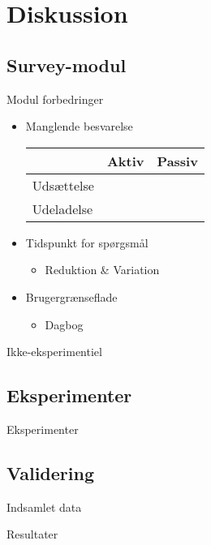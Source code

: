 \section{Diskussion}
\subsection{Survey-modul}
\begin{frame}{Modul forbedringer}
\begin{itemize}
\item Manglende besvarelse\\
\begin{tabular}{|l|l|l|}\cline{2-3}
\multicolumn{1}{l|}{} & Aktiv & Passiv\\\hline
Udsættelse & & \\\hline
Udeladelse & & \\\hline
\end{tabular}
\end{itemize}
\begin{itemize}
\item Tidspunkt for spørgsmål
\begin{itemize}
\item Reduktion \& Variation
\end{itemize}
\item Brugergrænseflade
\begin{itemize}
\item Dagbog
\end{itemize}
\end{itemize}
\end{frame}

\begin{frame}{Ikke-eksperimentiel}
\end{frame}

\subsection{Eksperimenter}
\begin{frame}{Eksperimenter}
\end{frame}

\subsection{Validering}
\begin{frame}{Indsamlet data}
\end{frame}
\begin{frame}{Resultater}
\end{frame}

